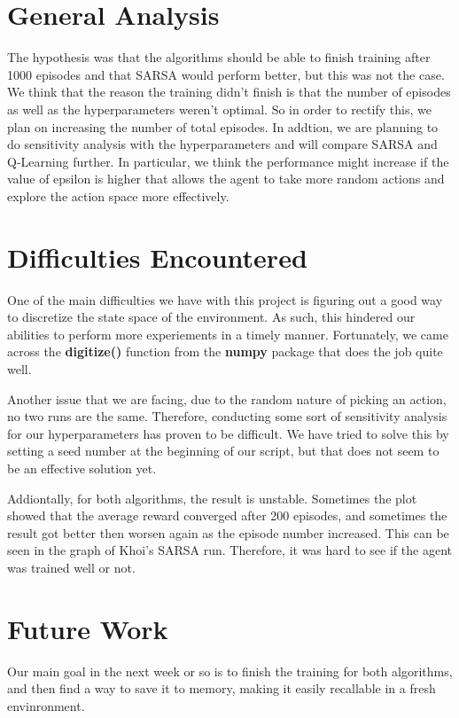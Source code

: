 \documentclass[nohyperref]{article}
\theoremstyle{plain}
\theoremstyle{definition}
\theoremstyle{remark}
\begin{document}
\section{General Analysis}

The hypothesis was that the algorithms should be able to finish training after 1000 episodes and that SARSA would perform better, but this was not the case. 
We think that the reason the training didn't finish is that the number of episodes as well as the hyperparameters weren't optimal. 
So in order to rectify this, we plan on increasing the number of total episodes. 
In addtion, we are planning to do sensitivity analysis with the hyperparameters and will compare SARSA and Q-Learning further.
In particular, we think the performance might increase if the value of epsilon is higher that allows the agent to take more random actions and explore the action space more effectively.

\section{Difficulties Encountered}

One of the main difficulties we have with this project is figuring out a good way to discretize the state space of the environment.
As such, this hindered our abilities to perform more experiements in a timely manner.
Fortunately, we came across the \textbf{digitize()} function from the \textbf{numpy} package that does the job quite well.

Another issue that we are facing, due to the random nature of picking an action, no two runs are the same. Therefore, conducting some sort of
sensitivity analysis for our hyperparameters has proven to be difficult. We have tried to solve this by setting a seed number at the beginning
of our script, but that does not seem to be an effective solution yet.

Addiontally, for both algorithms, the result is unstable. Sometimes the plot showed that the average reward converged after 200 episodes, 
and sometimes the result got better then worsen again as the episode number increased. This can be seen in the graph of Khoi's SARSA run.
Therefore, it was hard to see if the agent was trained well or not.

\section{Future Work}

Our main goal in the next week or so is to finish the training for both algorithms, and then find a way to save it to memory, making it easily recallable in a fresh envinronment.
\end{document}
